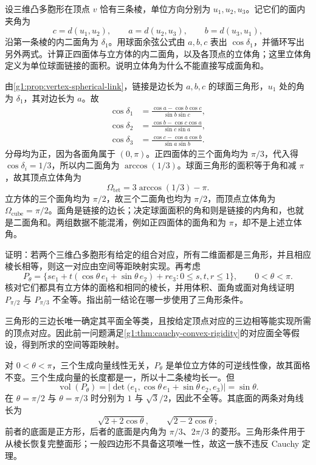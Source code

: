 \begin{exercise}\label{g1:ex:E04:trihedral-link}
	设三维凸多胞形在顶点 \(v\) 恰有三条棱，单位方向分别为 \(u_1,u_2,u_3\)。记它们的面内夹角为
	\[
		c=d(u_1,u_2),\qquad a=d(u_2,u_3),\qquad b=d(u_3,u_1),
	\]
	沿第一条棱的内二面角为 \(\delta_1\)。用球面余弦公式由 \(a,b,c\) 表出 \(\cos\delta_1\)，并循环写出另外两式。计算正四面体与立方体的内二面角，以及各顶点的立体角；这里立体角定义为单位球面链接的面积。说明立体角为什么不能直接写成面角和。
\end{exercise}
\begin{solution}
	由\cref{g1:prop:vertex-spherical-link}，链接是边长为 \(a,b,c\) 的球面三角形，\(u_1\) 处的角为 \(\delta_1\)，其对边长为 \(a\)。故
	\begin{align*}
		\cos\delta_1&=\frac{\cos a-\cos b\cos c}{\sin b\sin c},\\
		\cos\delta_2&=\frac{\cos b-\cos c\cos a}{\sin c\sin a},\\
		\cos\delta_3&=\frac{\cos c-\cos a\cos b}{\sin a\sin b}.
	\end{align*}
	分母均为正，因为各面角属于 \((0,\pi)\)。正四面体的三个面角均为 \(\pi/3\)，代入得 \(\cos\delta_i=1/3\)，所以内二面角为 \(\arccos(1/3)\)。球面三角形的面积等于角和减 \(\pi\)，故其顶点立体角为
	\[
		\Omega_{\mathrm{tet}}=3\arccos(1/3)-\pi.
	\]
	立方体的三个面角均为 \(\pi/2\)，故三个二面角也均为 \(\pi/2\)，而顶点立体角为 \(\Omega_{\mathrm{cube}}=\pi/2\)。面角是链接的边长；决定球面面积的角和则是链接的内角和，也就是二面角和。两组数据不能混淆，例如正四面体的面角和为 \(\pi\)，却不是上述立体角。
\end{solution}

\begin{exercise}\label{g1:ex:E04:edge-data}
	证明：若两个三维凸多胞形有给定的组合对应，所有二维面都是三角形，并且相应棱长相等，则这一对应由空间等距映射实现。再考虑
	\[
		P_\theta=\{s e_1+t(\cos\theta\,e_1+\sin\theta\,e_2)+r e_3:0\le s,t,r\le1\},\qquad 0<\theta<\pi.
	\]
	核对它们都具有立方体的面格和相同的棱长，并用体积、面角或面对角线证明 \(P_{\pi/2}\) 与 \(P_{\pi/3}\) 不全等。指出前一结论在哪一步使用了三角形条件。
\end{exercise}
\begin{solution}
	三角形的三边长唯一确定其平面全等类，且按给定顶点对应的三边相等能实现所需的顶点对应。因此前一问题满足\cref{g1:thm:cauchy-convex-rigidity}的对应面全等假设，得到所求的空间等距映射。

	对 \(0<\theta<\pi\)，三个生成向量线性无关，\(P_\theta\) 是单位立方体的可逆线性像，故其面格不变。三个生成向量的长度都是一，所以十二条棱均长一。但
	\[
		\operatorname{vol}(P_\theta)=\left|\det\bigl(e_1,\cos\theta\,e_1+\sin\theta\,e_2,e_3\bigr)\right|=\sin\theta.
	\]
	在 \(\theta=\pi/2\) 与 \(\theta=\pi/3\) 时分别为 \(1\) 与 \(\sqrt3/2\)，因此不全等。其底面的两条对角线长为
	\[
		\sqrt{2+2\cos\theta},\qquad \sqrt{2-2\cos\theta};
	\]
	前者的底面是正方形，后者的底面是内角为 \(\pi/3\)、\(2\pi/3\) 的菱形。三角形条件用于从棱长恢复完整面形；一般四边形不具备这项唯一性，故这一族不违反 Cauchy 定理。
\end{solution}

